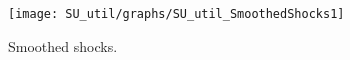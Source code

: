  
\begin{figure}[H]
\centering 
\texttt{[image: SU\_util/graphs/SU\_util\_SmoothedShocks1]}
\caption{Smoothed shocks.}\label{Fig:SmoothedShocks:1}
\end{figure}


